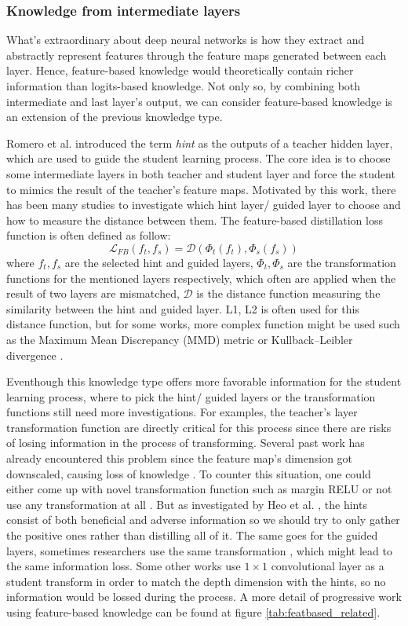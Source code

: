 \subsubsection{Knowledge from intermediate layers}
What's extraordinary about deep neural networks is how they extract and abstractly represent features through the feature maps generated between each layer. Hence, feature-based knowledge would theoretically contain richer information than logits-based knowledge. Not only so, by combining both intermediate and last layer's output, we can consider feature-based knowledge is an extension of the previous knowledge type.

Romero et al. \cite{featurebased01} introduced the term \textit{hint} as the outputs of a teacher hidden layer, which are used to guide the student learning process. The core idea is to choose some intermediate layers in both teacher and student layer and force the student to mimics the result of the teacher's feature maps. Motivated by this work, there has been many studies to investigate which hint layer/ guided layer to choose and how to measure the distance between them. The feature-based distillation loss function is often defined as follow:
\[
   \mathcal{L}_{FB}(f_t, f_s) = \mathcal{D}(\Phi_t(f_t), \Phi_s(f_s))
\]
where $f_t, f_s$ are the selected hint and guided layers, $\Phi_t, \Phi_s$ are the transformation functions for the mentioned layers respectively, which often are applied when the result of two layers are mismatched, $\mathcal{D}$ is the distance function measuring the similarity between the hint and guided layer. L1, L2 is often used for this distance function, but for some works, more complex function might be used such as the Maximum Mean Discrepancy (MMD) metric \cite{featurebased04_mmd} or Kullback–Leibler divergence \cite{featurebased05_kl}.

Eventhough this knowledge type offers more favorable information for the student learning process, where to pick the hint/ guided layers or the transformation functions still need more investigations. For examples, the teacher's layer transformation function are directly critical for this process since there are risks of losing information in the process of transforming. Several past work has already encountered this problem since the feature map's dimension got downscaled, causing loss of knowledge \cite{featurebased02_AT,featurebased06_meal}. To counter this situation, one could either come up with novel transformation function such as margin RELU\cite{featurebased03_relu} or not use any transformation at all \cite{featurebased01}. But as investigated by Heo et al. \cite{featurebased03_relu}, the hints consist of both beneficial and adverse information so we should try to only gather the positive ones rather than distilling all of it. The same goes for the guided layers, sometimes researchers use the same transformation \cite{featurebased02_AT}, which might lead to the same information loss. Some other works use $1 \times 1$ convolutional layer as a student transform \cite{featurebased01,featurebased03_relu} in order to match the depth dimension with the hints, so no information would be lossed during the process. A more detail of progressive work using feature-based knowledge can be found at figure \ref{tab:featbased_related}.